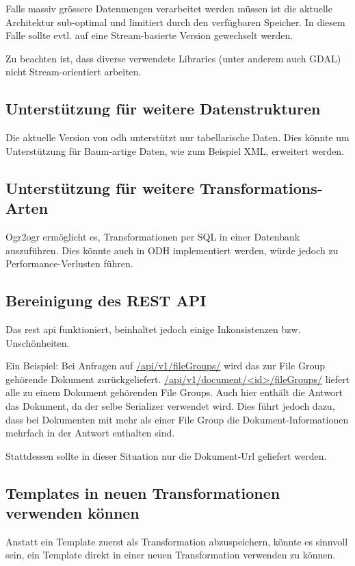 Falls massiv grössere Datenmengen verarbeitet werden müssen ist die aktuelle Architektur sub-optimal und limitiert durch den verfügbaren Speicher. In diesem Falle sollte evtl. auf eine Stream-basierte Version gewechselt werden.

Zu beachten ist, dass diverse verwendete Libraries (unter anderem auch GDAL) nicht Stream-orientiert arbeiten.

\subsection{Unterstützung für weitere Datenstrukturen}
Die aktuelle Version von \acs{odh} unterstützt nur tabellarische Daten. Dies könnte um Unterstützung für Baum-artige Daten, wie zum Beispiel XML, erweitert werden. 

\subsection{Unterstützung für weitere Transformations-Arten}
Ogr2ogr ermöglicht es, Transformationen per SQL in einer Datenbank auszuführen. Dies könnte auch in ODH implementiert werden, würde jedoch zu Performance-Verlusten führen.

\subsection{Bereinigung des REST API}
Das \gls{rest} \acs{api} funktioniert, beinhaltet jedoch einige Inkonsistenzen bzw. Unschönheiten. 

Ein Beispiel:
Bei Anfragen auf \url{/api/v1/fileGroups/} wird das zur File Group gehörende Dokument zurückgeliefert.
\url{/api/v1/document/<id>/fileGroups/} liefert alle zu einem Dokument gehörenden File Groups. Auch hier enthält die Antwort das Dokument, da der selbe Serializer verwendet wird. Dies führt jedoch dazu, dass bei Dokumenten mit mehr als einer File Group die Dokument-Informationen mehrfach in der Antwort enthalten sind.

Stattdessen sollte in dieser Situation nur die Dokument-Url geliefert werden.

\subsection{Templates in neuen Transformationen verwenden können}
Anstatt ein Template zuerst als Transformation abzuspeichern, könnte es sinnvoll sein, ein Template direkt in einer neuen Transformation verwenden zu können.

